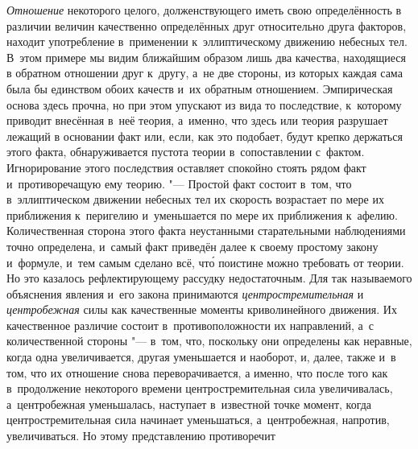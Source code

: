 {\em Отношение} некоторого целого, долженствующего иметь свою определённость в
различии величин качественно определённых друг относительно друга факторов,
находит употребление в~применении к~эллиптическому движению небесных тел.
В~этом примере мы видим ближайшим образом лишь два качества, находящиеся в
обратном отношении друг к~другу, а~не две стороны, из которых каждая сама была
бы единством обоих качеств и~их обратным отношением. Эмпирическая основа здесь
прочна, но при этом упускают из вида то последствие, к~которому приводит
внесённая в~неё теория, а~именно, что здесь или теория разрушает лежащий в
основании факт или, если, как это подобает, будут крепко держаться этого факта,
обнаруживается пустота теории в~сопоставлении с~фактом. Игнорирование этого
последствия оставляет спокойно стоять рядом факт и~противоречащую ему теорию.
"--- Простой факт состоит в~том, что в~эллиптическом движении небесных тел их
скорость возрастает по мере их приближения к~перигелию и~уменьшается по мере их
приближения к~афелию. Количественная сторона этого факта неустанными
старательными наблюдениями точно определена, и~самый факт приведён далее к
своему простому закону и~формуле, и~тем самым сделано всё, чт\'{о} поистине
можно требовать от теории. Но это казалось рефлектирующему рассудку
недостаточным. Для так называемого объяснения явления и~его закона принимаются
{\em центростремительная} и {\em центробежная} силы как качественные моменты
криволинейного движения. Их качественное различие состоит в~противоположности
их направлений, а~с количественной стороны "--- в~том, что, поскольку они
определены как неравные, когда одна увеличивается, другая уменьшается и
наоборот, и, далее, также и~в том, что их отношение снова переворачивается, а
именно, что после того как в~продолжение некоторого времени центростремительная
сила увеличивалась, а~центробежная уменьшалась, наступает в~известной точке
момент, когда центростремительная сила начинает уменьшаться, а~центробежная,
напротив, увеличиваться. Но этому представлению противоречит
